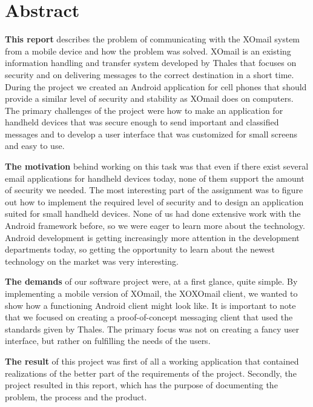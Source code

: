 
\chapter*{Abstract}

\textbf{This report} describes the problem of communicating with the XOmail system from a mobile device and how the problem was solved. XOmail is an existing information handling and transfer system developed by Thales that focuses on security and on delivering messages to the correct destination in a short time. During the project we created an Android application for cell phones that should provide a similar level of security and stability as XOmail does on computers. The primary challenges of the project were how to make an application for handheld devices that was secure enough to send important and classified messages and to develop a user interface that was customized for small screens and easy to use.
\newline

\textbf{The motivation} behind working on this task was that even if there exist several email applications for handheld devices today, none of them support the amount of security we needed. The most interesting part of the assignment was to figure out how to implement the required level of security and to design an application suited for small handheld devices. None of us had done extensive work with the Android framework before, so we were eager to learn more about the technology. Android development is getting increasingly more attention in the development departments today, so getting the opportunity to learn about the newest technology on the market was very interesting.
\newline

\textbf{The demands} of our software project were, at a first glance, quite simple. By implementing a mobile version of XOmail, the XOXOmail client, we wanted to show how a functioning Android client might look like. It is important to note that we focused on creating a proof-of-concept messaging client that used the standards given by Thales. The primary focus was not on creating a fancy user interface, but rather on fulfilling the needs of the users.
\newline

\textbf{The result} of this project was first of all a working application that contained realizations of the better part of the requirements of the project. Secondly, the project resulted in this report, which has the purpose of documenting the problem, the process and the product.